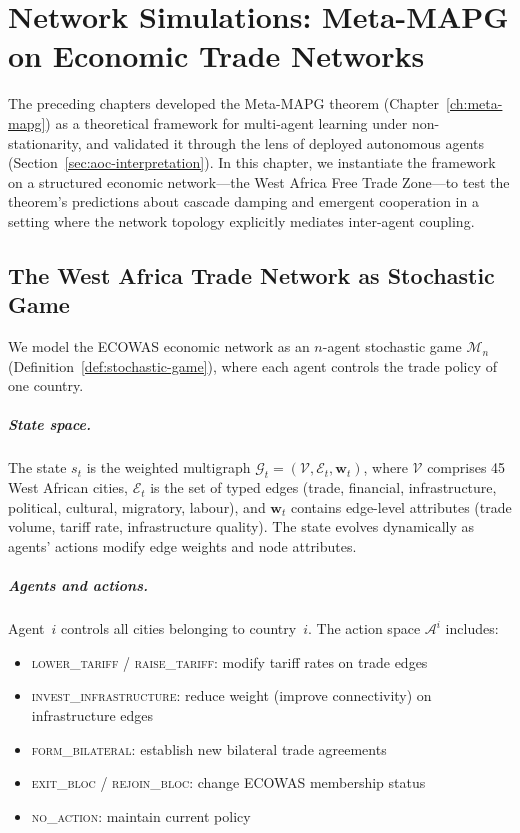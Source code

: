 
\chapter{Network Simulations: Meta-MAPG on Economic Trade Networks}
\label{ch:simulations}

The preceding chapters developed the Meta-MAPG theorem (Chapter~\ref{ch:meta-mapg}) as a theoretical framework for multi-agent learning under non-stationarity, and validated it through the lens of deployed autonomous agents (Section~\ref{sec:aoc-interpretation}). In this chapter, we instantiate the framework on a structured economic network---the West Africa Free Trade Zone---to test the theorem's predictions about cascade damping and emergent cooperation in a setting where the network topology explicitly mediates inter-agent coupling.

\section{The West Africa Trade Network as Stochastic Game}
\label{sec:trade-network-game}

We model the ECOWAS economic network as an $n$-agent stochastic game $\mathcal{M}_n$ (Definition~\ref{def:stochastic-game}), where each agent controls the trade policy of one country.

\paragraph{State space.} The state $s_t$ is the weighted multigraph $\mathcal{G}_t = (\mathcal{V}, \mathcal{E}_t, \mathbf{w}_t)$, where $\mathcal{V}$ comprises 45 West African cities, $\mathcal{E}_t$ is the set of typed edges (trade, financial, infrastructure, political, cultural, migratory, labour), and $\mathbf{w}_t$ contains edge-level attributes (trade volume, tariff rate, infrastructure quality). The state evolves dynamically as agents' actions modify edge weights and node attributes.

\paragraph{Agents and actions.} Agent~$i$ controls all cities belonging to country~$i$. The action space $\mathcal{A}^i$ includes:
\begin{itemize}
  \item \textsc{lower\_tariff} / \textsc{raise\_tariff}: modify tariff rates on trade edges
  \item \textsc{invest\_infrastructure}: reduce weight (improve connectivity) on infrastructure edges
  \item \textsc{form\_bilateral}: establish new bilateral trade agreements
  \item \textsc{exit\_bloc} / \textsc{rejoin\_bloc}: change ECOWAS membership status
  \item \textsc{no\_action}: maintain current policy
\end{itemize}

